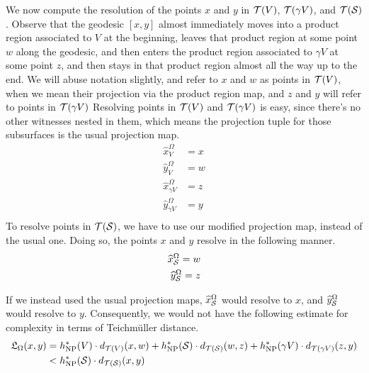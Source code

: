 \begin{example}
  We now compute the resolution of the points $x$ and $y$ in $\mathcal{T}(V)$, $\mathcal{T}(\gamma V)$, and $\mathcal{T}(\mathcal{S})$.
  Observe that the geodesic $[x,y]$ almost immediately moves into a product region associated to $V$ at the beginning, leaves that product region at some point $w$ along the geodesic, and then enters the product region associated to $\gamma V$ at some point $z$, and then stays in that product region almost all the way up to the end.
  We will abuse notation slightly, and refer to $x$ and $w$ as points in $\mathcal{T}(V)$, when we mean their projection via the product region map, and $z$ and $y$ will refer to points in $\mathcal{T}(\gamma V)$
  Resolving points in $\mathcal{T}(V)$ and $\mathcal{T}(\gamma V)$ is easy, since there's no other witnesses nested in them, which means the projection tuple for those subsurfaces is the usual projection map.
  \begin{align*}
    \widehat{x}_V^{\Omega} &= x \\
    \widehat{y}_V^{\Omega} &= w \\
    \widehat{x}_{\gamma V}^{\Omega} &= z \\
    \widehat{y}_{\gamma V}^{\Omega} &= y \\
  \end{align*}
  To resolve points in $\mathcal{T}(\mathcal{S})$, we have to use our modified projection map, instead of the usual one.
  Doing so, the points $x$ and $y$ resolve in the following manner.
  \begin{align*}
    \widehat{x}_{\mathcal{S}}^{\Omega} = w \\
    \widehat{y}_{\mathcal{S}}^{\Omega} = z
  \end{align*}

  If we instead used the usual projection maps, $\widehat{x}_{\mathcal{S}}^{\Omega}$ would resolve to $x$, and $\widehat{y}_{\mathcal{S}}^{\Omega}$ would resolve to $y$.
  Consequently, we would not have the following estimate for complexity in terms of Teichmüller distance.
  \begin{align*}
    \mathfrak{L}_{\Omega}(x,y) &= h_{\mathrm{NP}}^{\ast}(V) \cdot d_{\mathcal{T}(V)}(x, w) + h_{\mathrm{NP}}^{\ast}(\mathcal{S}) \cdot d_{\mathcal{T}(\mathcal{S})}(w, z) + h_{\mathrm{NP}}^{\ast}(\gamma V) \cdot d_{\mathcal{T}(\gamma V)}(z, y) \\
    &< h_{\mathrm{NP}}^{\ast}(\mathcal{S}) \cdot d_{\mathcal{T}(\mathcal{S})}(x, y)
  \end{align*}
\end{example}

